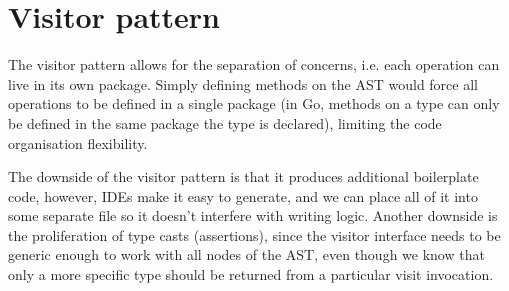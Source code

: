 \section{Visitor pattern}

The visitor pattern allows for the separation of concerns, i.e. each operation
can live in its own package. Simply defining methods on the AST would force all
operations to be defined in a single package (in Go, methods on a type can only
be defined in the same package the type is declared), limiting the code
organisation flexibility.

The downside of the visitor pattern is that it produces additional boilerplate
code, however, IDEs make it easy to generate, and we can place all of it into
some separate file so it doesn't interfere with writing logic. Another downside
is the proliferation of type casts (assertions), since the visitor interface
needs to be generic enough to work with all nodes of the AST, even though we
know that only a more specific type should be returned from a particular visit
invocation.
